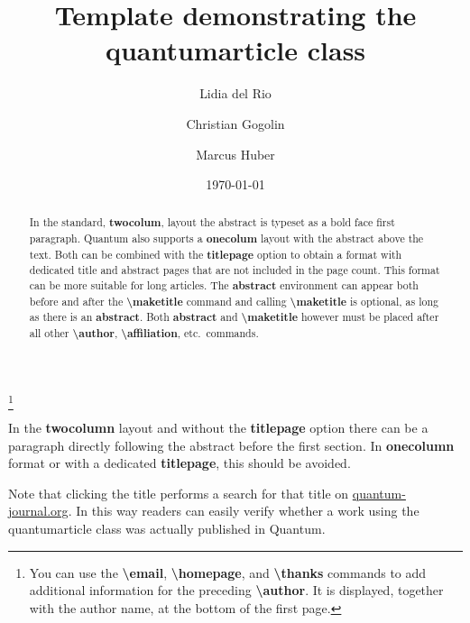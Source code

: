 \documentclass[prx,a4paper,aps,twocolumn,superscriptaddress,11pt]{quantumarticle}
\begin{document}
\title{Template demonstrating the quantumarticle class}
\date{\today}
\author{Lidia del Rio}
\author{Christian Gogolin}
\thanks{You can use the \textbf{\textbackslash{}email}, \textbf{\textbackslash{}homepage}, and \textbf{\textbackslash{}thanks} commands to add additional information for the preceding \textbf{\textbackslash{}author}. It is displayed, together with the author name, at the bottom of the first page.}
\author{Marcus Huber}

\maketitle

\begin{abstract}
  In the standard, \textbf{twocolum}, layout the abstract is typeset as a bold face first paragraph.
  Quantum also supports a \textbf{onecolum} layout with the abstract above the text.
  Both can be combined with the \textbf{titlepage} option to obtain a format with dedicated title and abstract pages that are not included in the page count. 
  This format can be more suitable for long articles.
  The \textbf{abstract} environment can appear both before and after the \textbf{\textbackslash{}maketitle} command and calling \textbf{\textbackslash{}maketitle} is optional, as long as there is an \textbf{abstract}.
  Both \textbf{abstract} and \textbf{\textbackslash{}maketitle} however must be placed after all other \textbf{\textbackslash{}author}, \textbf{\textbackslash{}affiliation}, etc.\ commands.
\end{abstract}


In the \textbf{twocolumn} layout and without the \textbf{titlepage} option there can be a paragraph directly following the abstract before the first section.
In \textbf{onecolumn} format or with a dedicated \textbf{titlepage}, this should be avoided.

Note that clicking the title performs a search for that title on \href{http://quantum-journal.org}{quantum-journal.org}.
In this way readers can easily verify whether a work using the quantumarticle class was actually published in Quantum.
\end{document}
